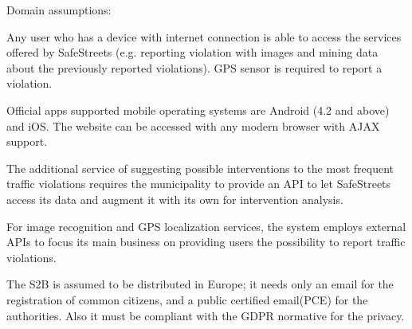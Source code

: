 Domain assumptions:
\begin{enumerate}[label={D\arabic*.}]
	 \label{D_email}
     \label{D_reports}
     \label{D_mun_availability}
   	 \label{D_mun_accuracy}
     \label{D_supervisor}
     \label{D_gps}
     \label{D_internet}
     \label{D_city_auth}
     \label{D_pce}
     \label{D_pce_api}
    \label{D_unique_license_plate}
\end{enumerate}

Any user who has a device with internet connection is able to access the services offered by SafeStreets (e.g. reporting violation with images and mining data about the previously reported violations). GPS sensor is required to report a violation.

Official apps supported mobile operating systems are Android (4.2 and above) and iOS. The website can be accessed with any modern browser with AJAX support.

The additional service of suggesting possible interventions to the most frequent traffic violations requires the municipality to provide an API to let SafeStreets access its data and augment it with its own for intervention analysis.

For image recognition and GPS localization services, the system employs external APIs to focus its main business on providing users the possibility to report traffic violations.

The S2B is assumed to be distributed in Europe; it needs only an email for the registration of common citizens, and a public certified email(PCE) for the authorities. Also it must be compliant with the GDPR normative for the privacy.